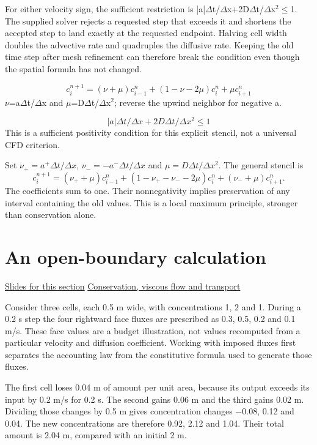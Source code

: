 \documentclass[11pt,letterpaper]{article}
\theoremstyle{definition}\newtheorem{definition}{Definition}\newtheorem{example}{Example}
\numberwithin{equation}{section}
\begin{document}
For either velocity sign, the sufficient restriction is |a|\ensuremath{\Delta}t/\ensuremath{\Delta}x+2D\ensuremath{\Delta}t/\ensuremath{\Delta}x\ensuremath{^{2}}\ensuremath{\le}1. The supplied solver rejects a requested step that exceeds it and shortens the accepted step to land exactly at the requested endpoint. Halving cell width doubles the advective rate and quadruples the diffusive rate. Keeping the old time step after mesh refinement can therefore break the condition even though the spatial formula has not changed.

\[
c_i^{n+1}=(\nu+\mu)c_{i-1}^n+(1-\nu-2\mu)c_i^n+\mu c_{i+1}^n
\]
\ensuremath{\nu}=a\ensuremath{\Delta}t/\ensuremath{\Delta}x and \ensuremath{\mu}=D\ensuremath{\Delta}t/\ensuremath{\Delta}x\ensuremath{^{2}}; reverse the upwind neighbor for negative a.

\[
|a|\Delta t/\Delta x+2D\Delta t/\Delta x^2\le1
\]
This is a sufficient positivity condition for this explicit stencil, not a universal CFD criterion.

Set $\nu_+=a^+\Delta t/\Delta x$, $\nu_-=-a^-\Delta t/\Delta x$ and $\mu=D\Delta t/\Delta x^2$. The general stencil is
\[
 c_i^{n+1}=(\nu_++\mu)c_{i-1}^n+
 (1-\nu_+-\nu_--2\mu)c_i^n+(\nu_-+\mu)c_{i+1}^n.
\]
The coefficients sum to one. Their nonnegativity implies preservation of any interval containing the old values. This is a local maximum principle, stronger than conservation alone.
\section{An open-boundary calculation}
\hypertarget{note-an-open-boundary-calculation}{}\label{note:an-open-boundary-calculation}
{\small \href{slides.html\#frame=an-open-boundary-step-panel-1\&step=1}{Slides for this section} \quad \href{../modules/cfd/index.html}{Conservation, viscous flow and transport}}\par
Consider three cells, each 0.5 m wide, with concentrations 1, 2 and 1. During a 0.2 s step the four rightward face fluxes are prescribed as 0.3, 0.5, 0.2 and 0.1 m/s. These face values are a budget illustration, not values recomputed from a particular velocity and diffusion coefficient. Working with imposed fluxes first separates the accounting law from the constitutive formula used to generate those fluxes.

The first cell loses 0.04 m of amount per unit area, because its output exceeds its input by 0.2 m/s for 0.2 s. The second gains 0.06 m and the third gains 0.02 m. Dividing those changes by 0.5 m gives concentration changes \ensuremath{-}0.08, 0.12 and 0.04. The new concentrations are therefore 0.92, 2.12 and 1.04. Their total amount is 2.04 m, compared with an initial 2 m.
\end{document}
